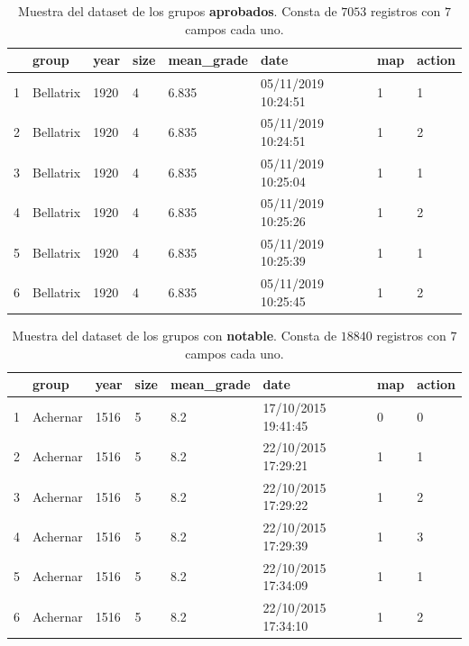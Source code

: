 \begin{table}[ht]
\centering
\begin{tabular}{rlllllll}
  \hline
 & group & year & size & mean\_grade & date & map & action \\ 
  \hline
1 & Bellatrix & 1920 & 4 & 6.835 & 05/11/2019 10:24:51 & 1 & 1 \\ 
  2 & Bellatrix & 1920 & 4 & 6.835 & 05/11/2019 10:24:51 & 1 & 2 \\ 
  3 & Bellatrix & 1920 & 4 & 6.835 & 05/11/2019 10:25:04 & 1 & 1 \\ 
  4 & Bellatrix & 1920 & 4 & 6.835 & 05/11/2019 10:25:26 & 1 & 2 \\ 
  5 & Bellatrix & 1920 & 4 & 6.835 & 05/11/2019 10:25:39 & 1 & 1 \\ 
  6 & Bellatrix & 1920 & 4 & 6.835 & 05/11/2019 10:25:45 & 1 & 2 \\ 
   \hline
\end{tabular}
\caption{Muestra del dataset de los grupos \textbf{aprobados}. Consta de $7053$ registros con $7$ campos cada uno.}
\label{table:12}
\end{table}

\begin{table}[ht]
\centering
\begin{tabular}{rlllllll}
  \hline
 & group & year & size & mean\_grade & date & map & action \\ 
  \hline
1 & Achernar & 1516 & 5 & 8.2 & 17/10/2015 19:41:45 & 0 & 0 \\ 
  2 & Achernar & 1516 & 5 & 8.2 & 22/10/2015 17:29:21 & 1 & 1 \\ 
  3 & Achernar & 1516 & 5 & 8.2 & 22/10/2015 17:29:22 & 1 & 2 \\ 
  4 & Achernar & 1516 & 5 & 8.2 & 22/10/2015 17:29:39 & 1 & 3 \\ 
  5 & Achernar & 1516 & 5 & 8.2 & 22/10/2015 17:34:09 & 1 & 1 \\ 
  6 & Achernar & 1516 & 5 & 8.2 & 22/10/2015 17:34:10 & 1 & 2 \\ 
   \hline
\end{tabular}
\caption{Muestra del dataset de los grupos con \textbf{notable}. Consta de $18840$ registros con $7$ campos cada uno.}
\label{table:13}
\end{table}

